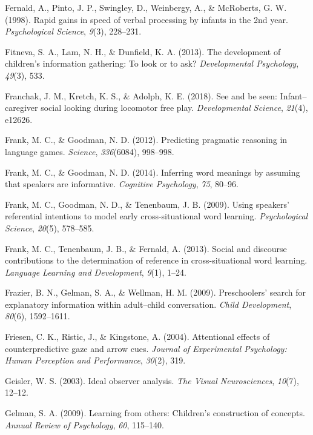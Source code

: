 \documentclass[oneside]{report}
\begin{document}
\hypertarget{ref-fernald1998rapid}{}
Fernald, A., Pinto, J. P., Swingley, D., Weinbergy, A., \& McRoberts, G.
W. (1998). Rapid gains in speed of verbal processing by infants in the
2nd year. \emph{Psychological Science}, \emph{9}(3), 228--231.

\hypertarget{ref-fitneva2013development}{}
Fitneva, S. A., Lam, N. H., \& Dunfield, K. A. (2013). The development
of children's information gathering: To look or to ask?
\emph{Developmental Psychology}, \emph{49}(3), 533.

\hypertarget{ref-franchak2018see}{}
Franchak, J. M., Kretch, K. S., \& Adolph, K. E. (2018). See and be
seen: Infant--caregiver social looking during locomotor free play.
\emph{Developmental Science}, \emph{21}(4), e12626.

\hypertarget{ref-frank2012predicting}{}
Frank, M. C., \& Goodman, N. D. (2012). Predicting pragmatic reasoning
in language games. \emph{Science}, \emph{336}(6084), 998--998.

\hypertarget{ref-frank2014inferring}{}
Frank, M. C., \& Goodman, N. D. (2014). Inferring word meanings by
assuming that speakers are informative. \emph{Cognitive Psychology},
\emph{75}, 80--96.

\hypertarget{ref-frank2009using}{}
Frank, M. C., Goodman, N. D., \& Tenenbaum, J. B. (2009). Using
speakers' referential intentions to model early cross-situational word
learning. \emph{Psychological Science}, \emph{20}(5), 578--585.

\hypertarget{ref-frank2013social}{}
Frank, M. C., Tenenbaum, J. B., \& Fernald, A. (2013). Social and
discourse contributions to the determination of reference in
cross-situational word learning. \emph{Language Learning and
Development}, \emph{9}(1), 1--24.

\hypertarget{ref-frazier2009preschoolers}{}
Frazier, B. N., Gelman, S. A., \& Wellman, H. M. (2009). Preschoolers'
search for explanatory information within adult--child conversation.
\emph{Child Development}, \emph{80}(6), 1592--1611.

\hypertarget{ref-friesen2004attentional}{}
Friesen, C. K., Ristic, J., \& Kingstone, A. (2004). Attentional effects
of counterpredictive gaze and arrow cues. \emph{Journal of Experimental
Psychology: Human Perception and Performance}, \emph{30}(2), 319.

\hypertarget{ref-geisler2003ideal}{}
Geisler, W. S. (2003). Ideal observer analysis. \emph{The Visual
Neurosciences}, \emph{10}(7), 12--12.

\hypertarget{ref-gelman2009learning}{}
Gelman, S. A. (2009). Learning from others: Children's construction of
concepts. \emph{Annual Review of Psychology}, \emph{60}, 115--140.
\end{document}
